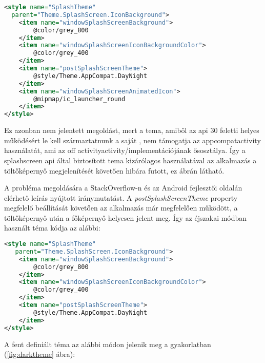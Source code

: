 \begin{lstlisting}[frame=single,language=xml,emph={style,item},
    emphstyle=\color{BurntOrange}\textbf,stringstyle=\color{OliveGreen}\textbf]
<style name="SplashTheme"
  parent="Theme.SplashScreen.IconBackground">
    <item name="windowSplashScreenBackground">
        @color/grey_800
    </item>
    <item name="windowSplashScreenIconBackgroundColor">
        @color/grey_400
    </item>
    <item name="postSplashScreenTheme">
        @style/Theme.AppCompat.DayNight
    </item>
    <item name="windowSplashScreenAnimatedIcon">
        @mipmap/ic_launcher_round
    </item>
</style>
\end{lstlisting}

Ez azonban nem jelentett megoldást, mert a \gls{tema}, amiből az \acrshort{api} 30 feletti helyes működésért
le kell származtatnunk a saját , nem támogatja az \gls{appcompat}\gls{activity} használatát, ami
az \acrlong{off} \gls{activity}{activity}\-/implementációjának ősosztálya. Így a \gls{splashscreen} \acrshort{api} által biztosított
\gls{tema} kizárólagos használatával az alkalmazás a töltőképernyő megjelenítését követően hibára futott,
ez \az{\ref{fig:appcompatcrash}} ábrán látható.

A probléma megoldására a StackOverflow-n és az Android fejlesztői oldalán elérhető leírás
nyújtott iránymutatást. A \textit{postSplashScreenTheme} property megfelelő beállítását követően
az alkalmazás már megfelelően működött, a töltőképernyő után a főképernyő helyesen jelent meg.
Így az éjszakai módban használt téma kódja az alábbi:

\begin{lstlisting}[frame=single,language=xml,emph={style,item},
    emphstyle=\color{BurntOrange}\textbf,stringstyle=\color{OliveGreen}\textbf]
 <style name="SplashTheme"
   parent="Theme.SplashScreen.IconBackground">
    <item name="windowSplashScreenBackground">
        @color/grey_800
    </item>
    <item name="windowSplashScreenIconBackgroundColor">
        @color/grey_400
    </item>
    <item name="postSplashScreenTheme">
        @style/Theme.AppCompat.DayNight
    </item>
</style>
\end{lstlisting}

A fent definiált téma az alábbi módon jelenik meg a gyakorlatban (\ref{fig:darktheme} ábra):


